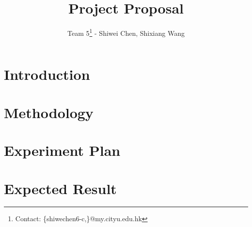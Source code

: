\documentclass{article}
\title{Project Proposal}
\author{Team 5\footnote{Contact: \{shiwechen6-c,\}@my.cityu.edu.hk}  \:- Shiwei Chen, Shixiang Wang}
\begin{document}
\maketitle

\section{Introduction}
\section{Methodology}
\section{Experiment Plan}
\section{Expected Result}

\begin{thebibliography}{00}

\end{thebibliography}
\end{document}
